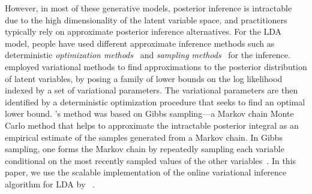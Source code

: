 However, in most of these generative models, posterior inference is 
intractable due to the high dimensionality of the latent variable 
space, and practitioners typically rely on approximate posterior 
inference alternatives. For the LDA model, people have used 
different approximate inference methods such as deterministic 
\textsl{optimization methods}~\cite{Blei2003} and \textsl{sampling 
methods}~\cite{Griffiths2004} for the inference. 
\citeauthor{Blei2003} employed variational methods to find 
approximations to the posterior distribution of latent variables, by 
posing a family of lower bounds on the log likelihood indexed 
by a set of variational parameters. The variational parameters are 
then identified by a deterministic optimization procedure that seeks 
to find an optimal lower bound. \citeauthor{Griffiths2004}'s method 
was based on Gibbs sampling---a Markov chain Monte Carlo 
method that helps to approximate the intractable posterior integral 
as an empirical estimate of the samples generated from a Markov chain.   
In Gibbs sampling, one forms the Markov chain by repeatedly sampling 
each variable conditional on the most recently sampled values of the 
other variables~\cite{Geman1984}. In this paper, we use the scalable 
implementation of the online variational inference algorithm for LDA
\cite{hoffman2010online} by~\citeauthor{rehurek_lrec} 
\citeyear{rehurek_lrec}. 



